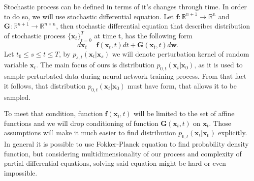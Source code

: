 \documentclass[10pt]{article}
\begin{document}
Stochastic process can be defined in terms of it's changes through time. In order to do so, we will use stochastic differential equation. Let $ \textbf{f}: \mathbb{R}^{n + 1} \to \mathbb{R}^n $ and $ \textbf{G}: \mathbb{R}^{n + 1} \to \mathbb{R}^{n \times n} $, then stochastic differential equation that describes distribution of stochastic process $\{ \textbf{x}_t\}_{t=0}^T$ at time t, has the following form
\begin{equation}
    d\textbf{x}_t =  \textbf{f}(\textbf{x}_t, t) dt +  \textbf{G}(\textbf{x}_t, t)d\textbf{w}.
\end{equation}
Let $t_0 \leq s \leq t \leq T$, by $p_{s,t}(\textbf{x}_t | \textbf{x}_s)$ we will denote perturbation kernel of random variable $\textbf{x}_t$. The main focus of ours is distribution  $p_{0,t}(\textbf{x}_t | \textbf{x}_0)$, as it is used to sample perturbated data during neural network training process. From that fact it follows, that distribution 
$p_{0,t}(\textbf{x}_t | \textbf{x}_0)$  must have form, that allows it to be sampled.

To meet that condition, function $\textbf{f}(\textbf{x}_t, t)$ will be limited to the set of affine functions and we will drop conditioning of function $\textbf{G}(\textbf{x}_t, t)$ on $\textbf{x}_t$. Those assumptions will make it much easier to find distribution $p_{0,t}(\textbf{x}_t | \textbf{x}_0)$ explicitly. In general it is possible to use Fokker-Planck equation to find probability density function, but considering multidimensionality of our process and complexity of partial differential equations, solving said equation might be hard or even impossible.
\end{document}
